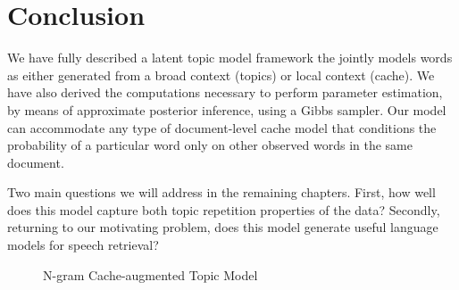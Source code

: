 \section{Conclusion}
We have fully described a latent topic model framework the jointly models words as either generated from a broad context (topics) or local context (cache).   We have also derived the computations necessary to perform parameter estimation, by means of approximate posterior inference, using a Gibbs sampler.  Our model can accommodate any type of document-level cache model that conditions the probability of a particular word only on other observed words in the same document.

Two main questions we will address in the remaining chapters.   First, how well does this model capture both topic repetition properties of the data?   Secondly, returning to our motivating problem, does this model generate useful language models for speech retrieval?


\begin{figure}[t]
\begin{center}
\scalebox{1.2}{}
\end{center}
\caption[Ngram $\kappa$LDA]{N-gram Cache-augmented Topic Model}
\end{figure}

